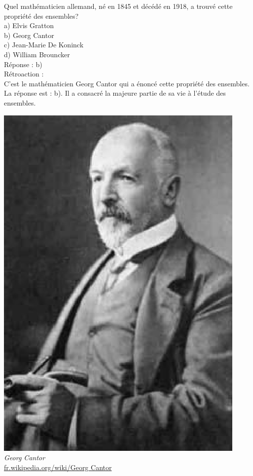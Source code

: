 \documentclass[letterpaper, 12pt]{article}
\begin{document}
Quel math\'ematicien allemand, n\'e en 1845 et d\'ec\'ed\'e en 1918, a trouv\'e cette propri\'et\'e des ensembles?\\

a) Elvis Gratton\\
b) Georg Cantor\\
c) Jean-Marie De Koninck\\
d) William Brouncker\\

R\'eponse : b)\\

R\'etroaction :\\
C'est le math\'ematicien Georg Cantor qui a \'enonc\'e cette propri\'et\'e des ensembles. La r\'eponse est : b). Il a consacr\'e la majeure partie de sa vie \`a l'\'etude des ensembles.
\begin{center}
\includegraphics[scale=0.4]{Georg_Cantor.eps}\\
\emph{{\small Georg Cantor}}\\
\href{http://fr.wikipedia.org/wiki/Georg_Cantor}{fr.wikipedia.org/wiki/Georg Cantor}\\[5mm]
\end{center}
\end{document}
